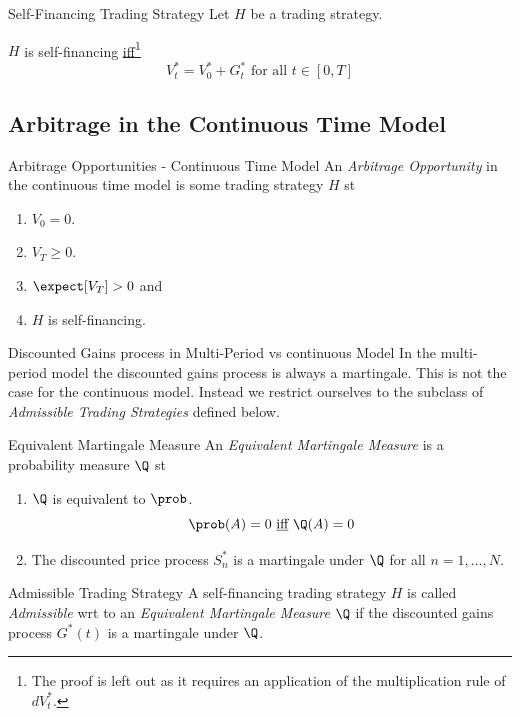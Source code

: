 \documentclass[11pt,a4paper]{article}
\begin{document}
  \begin{theorem}{Self-Financing Trading Strategy}\label{the_self_financing_continuous_time}
    Let $H$ be a trading strategy.
    \par $H$ is self-financing \underline{iff}\footnote{The proof is left out as it requires an application of the multiplication rule of $dV_t^*$.}
    \[ V_t^*=V_0^*+G_t^*\text{ for all }t\in[0,T] \]
  \end{theorem}

\subsection{Arbitrage in the Continuous Time Model}

  \begin{definition}{Arbitrage Opportunities - Continuous Time Model}
    An \textit{Arbitrage Opportunity} in the continuous time model is some trading strategy $H$ st
    \begin{enumerate}
      \item $V_0=0$.
      \item $V_T\geq0$.
      \item $\expect[V_T]>0$ and
      \item $H$ is self-financing.
    \end{enumerate}
  \end{definition}

  \begin{remark}{Discounted Gains process in Multi-Period vs continuous Model}
    In the multi-period model the discounted gains process is always a martingale. This is not the case for the continuous model. Instead we restrict ourselves to the subclass of \textit{Admissible Trading Strategies} defined below.
  \end{remark}

  \begin{definition}{Equivalent Martingale Measure}
    An \textit{Equivalent Martingale Measure} is a probability measure $\Q$ st
    \begin{enumerate}
      \item $\Q$ is equivalent to $\prob$.
      \[ \prob(A)=0\text{ \underline{iff} }\Q(A)=0 \]
      \item The discounted price process $S_n^*$ is a martingale under $\Q$ for all $n=1,\dots,N$.
    \end{enumerate}
  \end{definition}

  \begin{definition}{Admissible Trading Strategy}
    A self-financing trading strategy $H$ is called \textit{Admissible} wrt to an \textit{Equivalent Martingale Measure} $\Q$ if the discounted gains process $G^*(t)$ is a martingale under $\Q$.
  \end{definition}
\end{document}

